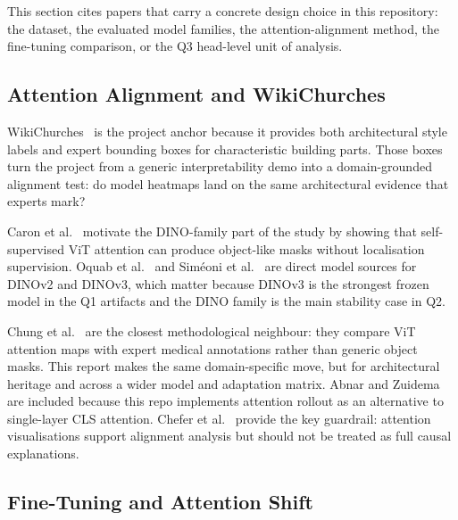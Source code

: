 \documentclass[lineno,pdflatex,sn-mathphys-num]{sn-jnl}%
\theoremstyle{thmstyleone}%
\theoremstyle{thmstyletwo}%
\theoremstyle{thmstylethree}%
\begin{document}
This section cites papers that carry a concrete design choice in this
repository: the dataset, the evaluated model families, the attention-alignment
method, the fine-tuning comparison, or the Q3 head-level unit of analysis.

\subsection{Attention Alignment and WikiChurches}

WikiChurches~\cite{Barz21WikiChurches} is the project anchor because it
provides both architectural style labels and expert bounding boxes for
characteristic building parts. Those boxes turn the project from a generic
interpretability demo into a domain-grounded alignment test: do model heatmaps
land on the same architectural evidence that experts mark?

Caron et al.~\cite{Caron21DINO} motivate the DINO-family part of the study by
showing that self-supervised ViT attention can produce object-like masks without
localisation supervision. Oquab et al.~\cite{Oquab24DINOv2} and Sim\'{e}oni et
al.~\cite{Simeoni25DINOv3} are direct model sources for DINOv2 and DINOv3,
which matter because DINOv3 is the strongest frozen model in the Q1 artifacts
and the DINO family is the main stability case in Q2.

Chung et al.~\cite{Chung25MedViT} are the closest methodological neighbour:
they compare ViT attention maps with expert medical annotations rather than
generic object masks. This report makes the same domain-specific move, but for
architectural heritage and across a wider model and adaptation matrix.
Abnar and Zuidema~\cite{Abnar20Rollout} are included because this repo
implements attention rollout as an alternative to single-layer CLS attention.
Chefer et al.~\cite{Chefer21Interp} provide the key guardrail: attention
visualisations support alignment analysis but should not be treated as full
causal explanations.

\subsection{Fine-Tuning and Attention Shift}
\end{document}
